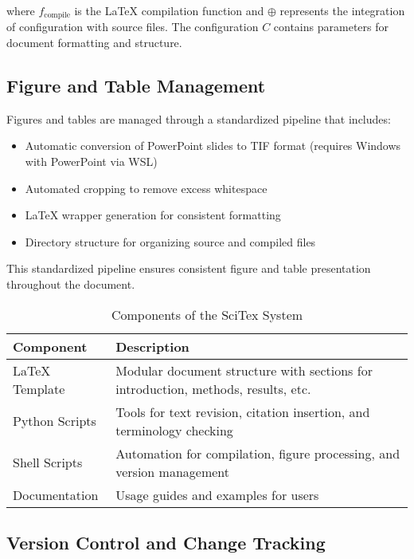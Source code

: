 where $f_{\text{compile}}$ is the LaTeX compilation function and $\oplus$ represents the integration of configuration with source files. The configuration $C$ contains parameters for document formatting and structure.


\subsection{Figure and Table Management}
\label{subsec:figure-management}

Figures and tables are managed through a standardized pipeline that includes:

\begin{itemize}
    \item Automatic conversion of PowerPoint slides to TIF format (requires Windows with PowerPoint via WSL)
    \item Automated cropping to remove excess whitespace
    \item LaTeX wrapper generation for consistent formatting
    \item Directory structure for organizing source and compiled files
\end{itemize}

This standardized pipeline ensures consistent figure and table presentation throughout the document.


\begin{table}[h!]
\centering
\caption{Components of the SciTex System}
\label{tab:components}
\begin{tabular}{lp{8cm}}
\hline
\textbf{Component} & \textbf{Description} \\
\hline
LaTeX Template & Modular document structure with sections for introduction, methods, results, etc. \\
Python Scripts & Tools for text revision, citation insertion, and terminology checking \\
Shell Scripts & Automation for compilation, figure processing, and version management \\
Documentation & Usage guides and examples for users \\
\hline
\end{tabular}
\end{table}

\subsection{Version Control and Change Tracking}
\label{subsec:version-control}

